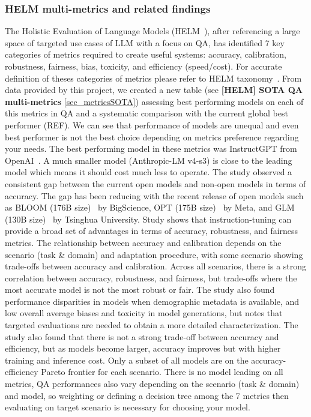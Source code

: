\documentclass[acmsmall]{acmart}
\begin{document}
\subsubsection{HELM multi-metrics and related findings}

The Holistic Evaluation of Language Models (HELM~\citep{liangetal.HolisticEvaluationLanguage2022}), after referencing a large space of targeted use cases of LLM with a focus on QA, has identified 7 key categories of metrics required to create useful systems: accuracy, calibration, robustness, fairness, bias, toxicity, and efficiency (speed/cost). For accurate definition of theses categories of metrics please refer to HELM taxonomy~\citep{liangetal.HolisticEvaluationLanguage2022}. From data provided by this project, we created a new table (see \textbf{[HELM] SOTA QA multi-metrics} \ref{sec_metricsSOTA}) assessing best performing models on each of this metrics in QA and a systematic comparison with the current global best performer (REF). We can see that performance of models are unequal and even best performer is not the best choice depending on metrics preference regarding your needs. The best performing model in these metrics was InstructGPT from OpenAI~\citep{chiusanoOpenAIInstructGPTBrings2022}. A much smaller model (Anthropic-LM v4-s3) is close to the leading model which means it should cost much less to operate. The study observed a consistent gap between the current open models and non-open models in terms of accuracy. The gap has been reducing with the recent release of open models such as BLOOM (176B size)~\citep{bigscienceetal.BLOOM176BParameterOpenAccess2022} by BigScience, OPT (175B size)~\citep{zhangOPTOpenPretrained2022} by Meta, and GLM (130B size)~\citep{zengGLM130BOpenBilingual2022} by Tsinghua University. Study shows that instruction-tuning can provide a broad set of advantages in terms of accuracy, robustness, and fairness metrics.
The relationship between accuracy and calibration depends on the scenario (task \& domain) and adaptation procedure, with some scenario showing trade-offs between accuracy and calibration.
Across all scenarios, there is a strong correlation between accuracy, robustness, and fairness, but trade-offs where the most accurate model is not the most robust or fair.
The study also found performance disparities in models when demographic metadata is available, and low overall average biases and toxicity in model generations, but notes that targeted evaluations are needed to obtain a more detailed characterization.
The study also found that there is not a strong trade-off between accuracy and efficiency, but as models become larger, accuracy improves but with higher training and inference cost. Only a subset of all models are on the accuracy-efficiency Pareto frontier for each scenario.
There is no model leading on all metrics, QA performances also vary depending on the scenario (task \& domain) and model, so weighting or defining a decision tree among the 7 metrics then evaluating on target scenario is necessary for choosing your model.
\end{document}
